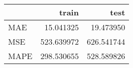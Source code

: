 \begin{tabular}{lrr}
\toprule
{} &       train &        test \\
\midrule
MAE  &   15.041325 &   19.473950 \\
MSE  &  523.639972 &  626.541744 \\
MAPE &  298.530655 &  528.589826 \\
\bottomrule
\end{tabular}
